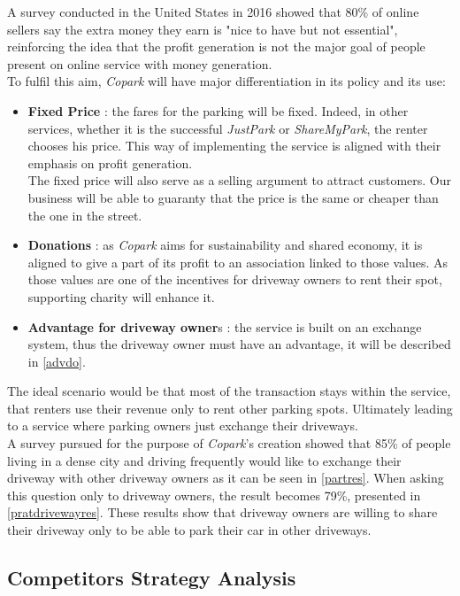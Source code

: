 \documentclass[12pt,a4paper,oneside]{book}
\newcommand{\bp}{\textit{Copark}}
\begin{document}
A survey conducted in the United States in 2016 showed that 80\% of online sellers say the extra money they earn is "nice to have but not essential", reinforcing the idea that the profit generation is not the major goal of people present on online service with money generation.\\

To fulfil this aim, \bp{} will have major differentiation in its policy and its use:
\begin{itemize}
\item \textbf{Fixed Price} : the fares for the parking will be fixed. Indeed, in other services, whether it is  the successful \textit{JustPark} or \textit{ShareMyPark}, the renter chooses his price. This way of implementing the service is aligned with their emphasis on profit generation.\\
The fixed price will also serve as a selling argument to attract customers. Our business will be able to guaranty that the price is the same or cheaper than the one in the street.
\item \textbf{Donations} : as \bp{} aims for sustainability and shared economy, it is aligned to give a part of its profit to an association linked to those values. As those values are one of the incentives for driveway owners to rent their spot, supporting charity will enhance it.
\item \textbf{Advantage for driveway owner}s : the service is built on an exchange system, thus the driveway owner must have an advantage, it will be described in \autoref{advdo}.
\end{itemize}

The ideal scenario would be that most of the transaction stays within the service, that renters use their revenue only to rent other parking spots. Ultimately leading to a service where parking owners just exchange their driveways.\\

A survey pursued for the purpose of \bp{}'s creation showed that 85\% of people living in a dense city and driving frequently would like to exchange their driveway with other driveway owners as it can be seen in \autoref{partres}. When asking this question only to driveway owners, the result becomes 79\%, presented in \autoref{pratdrivewayres}. These results show that driveway owners are willing to share their driveway only to be able to park their car in other driveways.

\subsection{Competitors Strategy Analysis}
\label{compsa}
\end{document}
